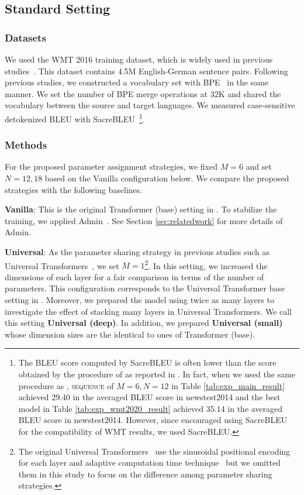 \documentclass[11pt]{article}
\begin{document}
\subsection{Standard Setting}
\label{sec:exp_standard_setting}

\subsubsection{Datasets}
We used the WMT 2016 training dataset, which is widely used in previous studies~\cite{NIPS2017_7181,ott-etal-2018-scaling,takase-kiyono-2021-rethinking}.
This dataset contains 4.5M English-German sentence pairs.
Following previous studies, we constructed a vocabulary set with BPE~\cite{sennrich-etal-2016-neural} in the same manner.
We set the number of BPE merge operations at 32K and shared the vocabulary between the source and target languages.
We measured case-sensitive detokenized BLEU with SacreBLEU~\cite{post-2018-call}\footnote{The BLEU score computed by SacreBLEU is often lower than the score obtained by the procedure of  as reported in . In fact, when we used the same procedure as , \textsc{sequence} of $M=6, N=12$ in Table \ref{tab:exp_main_result} achieved 29.40 in the averaged BLEU score in newstest2014 and the best model in Table \ref{tab:exp_wmt2020_result} achieved 35.14 in the averaged BLEU score in newstest2014. However, since  encouraged using SacreBLEU for the compatibility of WMT results, we used SacreBLEU.}.


\subsubsection{Methods}
For the proposed parameter assignment strategies, we fixed $M = 6$ and set $N = 12, 18$ based on the Vanilla configuration below.
We compare the proposed strategies with the following baselines.

\noindent\textbf{Vanilla}: This is the original Transformer (base) setting in \cite{NIPS2017_7181}.
To stabilize the training, we applied Admin~\cite{liu-etal-2020-understanding}.
See Section \ref{sec:relatedwork} for more details of Admin.

\noindent\textbf{Universal}: As the parameter sharing strategy in previous studies such as Universal Transformers~\cite{dehghani2019}, we set $M = 1$\footnote{The original Universal Transformers~\cite{dehghani2019} use the sinusoidal positional encoding for each layer and adaptive computation time technique~\cite{graves2017adaptive} but we omitted them in this study to focus on the difference among parameter sharing strategies.}.
In this setting, we increased the dimensions of each layer for a fair comparison in terms of the number of parameters.
This configuration corresponds to the Universal Transformer base setting in \cite{dehghani2019}.
Moreover, we prepared the model using twice as many layers to investigate the effect of stacking many layers in Universal Transformers.
We call this setting \textbf{Universal (deep)}.
In addition, we prepared \textbf{Universal (small)} whose dimension sizes are the identical to ones of Transformer (base).
\end{document}
